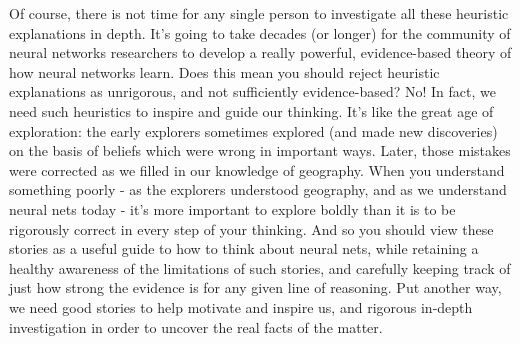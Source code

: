 Of course, there is not time for any single person to investigate all these heuristic explanations in depth. It's going to take decades (or longer) for the community of neural networks researchers to develop a really powerful, evidence-based theory of how neural networks learn. Does this mean you should reject heuristic explanations as unrigorous, and not sufficiently evidence-based? No! In fact, we need such heuristics to inspire and guide our thinking. It's like the great age of exploration: the early explorers sometimes explored (and made new discoveries) on the basis of beliefs which were wrong in important ways. Later, those mistakes were corrected as we filled in our knowledge of geography. When you understand something poorly - as the explorers understood geography, and as we understand neural nets today - it's more important to explore boldly than it is to be rigorously correct in every step of your thinking. And so you should view these stories as a useful guide to how to think about neural nets, while retaining a healthy awareness of the limitations of such stories, and carefully keeping track of just how strong the evidence is for any given line of reasoning. Put another way, we need good stories to help motivate and inspire us, and rigorous in-depth investigation in order to uncover the real facts of the matter.

